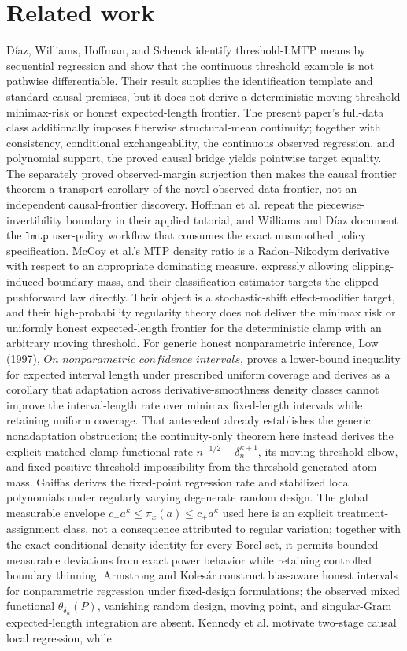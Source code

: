 \documentclass{article}
\begin{document}
\section{Related work}

Díaz, Williams, Hoffman, and Schenck identify threshold-LMTP means by sequential regression and show that the continuous threshold example is not pathwise differentiable. Their result supplies the identification template and standard causal premises, but it does not derive a deterministic moving-threshold minimax-risk or honest expected-length frontier. The present paper's full-data class additionally imposes fiberwise structural-mean continuity; together with consistency, conditional exchangeability, the continuous observed regression, and polynomial support, the proved causal bridge yields pointwise target equality. The separately proved observed-margin surjection then makes the causal frontier theorem a transport corollary of the novel observed-data frontier, not an independent causal-frontier discovery. Hoffman et al. repeat the piecewise-invertibility boundary in their applied tutorial, and Williams and Díaz document the \(\texttt{lmtp}\) user-policy workflow that consumes the exact unsmoothed policy specification. McCoy et al.'s MTP density ratio is a Radon--Nikodym derivative with respect to an appropriate dominating measure, expressly allowing clipping-induced boundary mass, and their classification estimator targets the clipped pushforward law directly. Their object is a stochastic-shift effect-modifier target, and their high-probability regularity theory does not deliver the minimax risk or uniformly honest expected-length frontier for the deterministic clamp with an arbitrary moving threshold. For generic honest nonparametric inference, Low (1997), \(\textit{On nonparametric confidence intervals}\), proves a lower-bound inequality for expected interval length under prescribed uniform coverage and derives as a corollary that adaptation across derivative-smoothness density classes cannot improve the interval-length rate over minimax fixed-length intervals while retaining uniform coverage. That antecedent already establishes the generic nonadaptation obstruction; the continuity-only theorem here instead derives the explicit matched clamp-functional rate \(n^{-1/2}+\delta_n^{\kappa+1}\), its moving-threshold elbow, and fixed-positive-threshold impossibility from the threshold-generated atom mass. Gaiffas derives the fixed-point regression rate and stabilized local polynomials under regularly varying degenerate random design. The global measurable envelope \(c_-a^\kappa\leq\pi_x(a)\leq c_+a^\kappa\) used here is an explicit treatment-assignment class, not a consequence attributed to regular variation; together with the exact conditional-density identity for every Borel set, it permits bounded measurable deviations from exact power behavior while retaining controlled boundary thinning. Armstrong and Kolesár construct bias-aware honest intervals for nonparametric regression under fixed-design formulations; the observed mixed functional \(\theta_{\delta_n}(P)\), vanishing random design, moving point, and singular-Gram expected-length integration are absent. Kennedy et al. motivate two-stage causal local regression, while 
\end{document}
